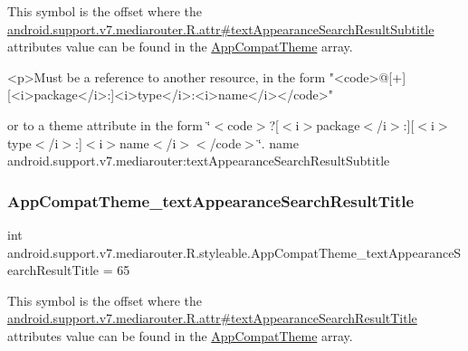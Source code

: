 This symbol is the offset where the \hyperlink{classandroid_1_1support_1_1v7_1_1mediarouter_1_1R_1_1attr_a7b7a74e51788828812a1e02bda2fbdb6}{android.\+support.\+v7.\+mediarouter.\+R.\+attr\#text\+Appearance\+Search\+Result\+Subtitle} attribute\textquotesingle{}s value can be found in the \hyperlink{classandroid_1_1support_1_1v7_1_1mediarouter_1_1R_1_1styleable_a4e3d3900c75d49aeb2f283cac00214d6}{App\+Compat\+Theme} array.

\begin{DoxyVerb}      <p>Must be a reference to another resource, in the form "<code>@[+][<i>package</i>:]<i>type</i>:<i>name</i></code>"
\end{DoxyVerb}
 or to a theme attribute in the form \char`\"{}$<$code$>$?\mbox{[}$<$i$>$package$<$/i$>$\+:\mbox{]}\mbox{[}$<$i$>$type$<$/i$>$\+:\mbox{]}$<$i$>$name$<$/i$>$$<$/code$>$\char`\"{}.  name android.\+support.\+v7.\+mediarouter\+:text\+Appearance\+Search\+Result\+Subtitle \mbox{\label{classandroid_1_1support_1_1v7_1_1mediarouter_1_1R_1_1styleable_a145215c955a16a489e091f3192f05b55}} 
\subsubsection{\texorpdfstring{App\+Compat\+Theme\+\_\+text\+Appearance\+Search\+Result\+Title}{AppCompatTheme\_textAppearanceSearchResultTitle}}
{\footnotesize\ttfamily int android.\+support.\+v7.\+mediarouter.\+R.\+styleable.\+App\+Compat\+Theme\+\_\+text\+Appearance\+Search\+Result\+Title = 65\hspace{0.3cm}{\ttfamily [static]}}

This symbol is the offset where the \hyperlink{classandroid_1_1support_1_1v7_1_1mediarouter_1_1R_1_1attr_a7d88573dc917c94b61750b6004b11c70}{android.\+support.\+v7.\+mediarouter.\+R.\+attr\#text\+Appearance\+Search\+Result\+Title} attribute\textquotesingle{}s value can be found in the \hyperlink{classandroid_1_1support_1_1v7_1_1mediarouter_1_1R_1_1styleable_a4e3d3900c75d49aeb2f283cac00214d6}{App\+Compat\+Theme} array.

